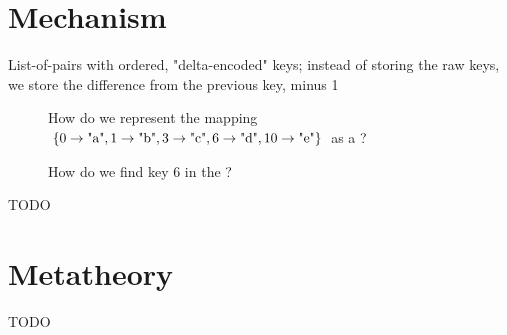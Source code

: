 \section{Mechanism}
\label{sec:Mechanism}
List-of-pairs with ordered, "delta-encoded" keys;
instead of storing the raw keys, we store
the difference from the previous key, minus 1
\begin{figure}[H]
  \centering
  \caption{How do we represent the mapping $\{0 \rightarrow \text{"a"}, 1 \rightarrow \text{"b"}, 3 \rightarrow \text{"c"}, 6 \rightarrow \text{"d"}, 10 \rightarrow \text{"e"}\}$ as a \dd?}
  \label{fig:mech1}
\end{figure}
\begin{figure}[H]
  \centering
  \caption{How do we find key $6$ in the \dd?}
  \label{fig:find-6}
\end{figure}

TODO

\section{Metatheory}
\label{sec:Metatheory}
TODO

